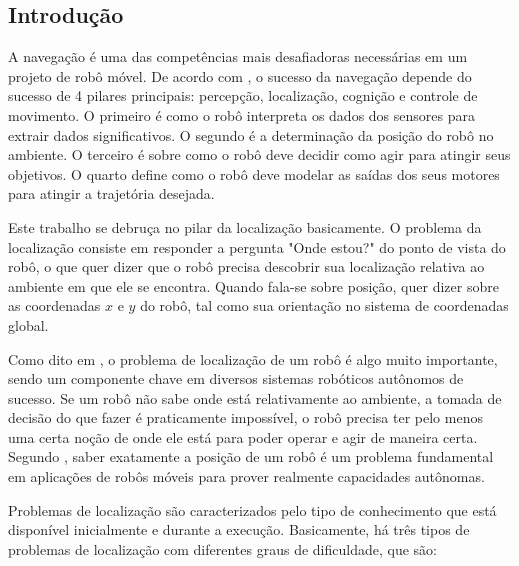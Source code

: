 \documentclass[acronym, symbols]{fei}
\begin{document}
		\subsection{Introdução}
		
			A navegação é uma das competências mais desafiadoras necessárias em um projeto de robô móvel. De acordo com \textcite{siegwart2011introduction}, o sucesso da navegação depende do sucesso de 4 pilares principais: percepção, localização, cognição e controle de movimento. O primeiro é como o robô interpreta os dados dos sensores para extrair dados significativos. O segundo é a determinação da posição do robô no ambiente. O terceiro é sobre como o robô deve decidir como agir para atingir seus objetivos. O quarto define como o robô deve modelar as saídas dos seus motores para atingir a trajetória desejada.
			
			Este trabalho se debruça no pilar da localização basicamente. O problema da localização consiste em responder a pergunta "Onde estou?" do ponto de vista do robô, o que quer dizer que o robô precisa descobrir sua localização relativa ao ambiente em que ele se encontra. Quando fala-se sobre posição, quer dizer sobre as coordenadas $x$ e $y$ do robô, tal como sua orientação no sistema de coordenadas global.
			
			Como dito em \textcite{thrun2001robust}, o problema de localização de um robô é algo muito importante, sendo um componente chave em diversos sistemas robóticos autônomos de sucesso. Se um robô não sabe onde está relativamente ao ambiente, a tomada de decisão do que fazer é praticamente impossível, o robô precisa ter pelo menos uma certa noção de onde ele está para poder operar e agir de maneira certa. Segundo \textcite{borenstein1997mobile}, saber exatamente a posição de um robô é um problema fundamental em aplicações de robôs móveis para prover realmente capacidades autônomas.
			
			Problemas de localização são caracterizados pelo tipo de conhecimento que está disponível inicialmente e durante a execução. Basicamente, há três tipos de problemas de localização com diferentes graus de dificuldade, que são:
			
\end{document}
